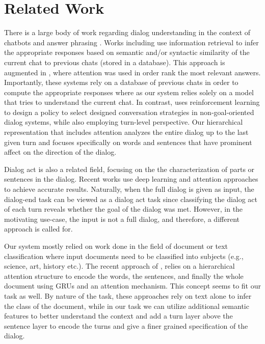 \section{Related Work}\label{sec:related}
There is a large body of work regarding dialog 
understanding in the context of chatbots and answer phrasing 
\cite{Jia09,ShawarA03,ShawarA08,BanchsK14,iris,noGoal,QiuLWGCZCHC17,YuXBR16,yu2016chatbot}. 
Works including \cite{iris,noGoal} use information 
retrieval to infer the appropriate responses based on 
semantic and/or syntactic similarity of the 
current chat to previous chats (stored in a database).  
This approach is augmented in \cite{QiuLWGCZCHC17}, 
where attention \cite{BahdanauCB14} was used in order 
rank the most relevant answers. 
Importantly, these systems rely on a database of previous 
chats in order to compute the appropriate responses where as 
our system relies solely on a model that tries to understand 
the current chat. 
In contrast, \cite{YuXBR16} uses reinforcement learning 
to design a policy to select designed
conversation strategies in non-goal-oriented dialog
systems, while also employing turn-level perspective. 
Our hierarchical representation 
that includes attention analyzes the entire dialog up to the last 
given turn and focuses specifically on words and sentences that 
have prominent affect on the direction of the dialog.

Dialog act \cite{DBLP:conf/icassp/JiB05,DBLP:conf/coling/WermterL96,AngLS05,SurendranL06,li2016multi,ortega2017neural} 
is also a related field, focusing on the 
the characterization of parts or sentences in the dialog. Recent works \cite{li2016multi,ortega2017neural} use 
deep learning and attention approaches to achieve accurate results. 
Naturally, when the full dialog is given as input, the dialog-end task 
can be viewed as a dialog act task since classifying the dialog act 
of each turn reveals whether the goal of the dialog was met. 
However, in the motivating use-case, the input is not a full dialog, and 
therefore, a different approach is called for. 

Our system mostly relied on work 
done in the field of document or text classification \cite{attention,ZhangZL15,Lai,elhadad2017novel,van2017effective} 
where input documents need to be classified into subjects 
(e.g., science, art, history etc.). 
The recent approach of \cite{attention}, 
relies on a hierarchical attention structure to 
encode the words, the sentences, and finally the whole document 
using GRUs and an attention mechanism. 
This concept seems to fit our task as well. 
By nature of the task, these approaches rely on text alone to infer the class 
of the document, while in our task we can utilize additional semantic features to better 
understand the context and add a turn layer above the sentence layer 
to encode the turns and give a finer grained specification of the dialog. 
